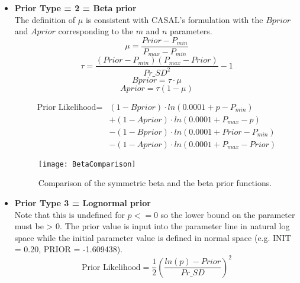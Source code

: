 \begin{itemize}
	
	\item \textbf{Prior Type = 2 = Beta prior}  \\ 
	The definition of $\mu$ is consistent with CASAL's formulation with the $Bprior$ and $Aprior$ corresponding to the $m$ and $n$ parameters.
	\begin{equation}
		\mu = \frac{Prior-P_{min}}{P_{max}-P_{min}} 
	\end{equation}
	\begin{equation}
		\tau  = \frac{(Prior-P_{min})(P_{max}-Prior)}{Pr\_SD^2}-1
	\end{equation}
	\begin{equation}
		Bprior  = \tau \cdot \mu
	\end{equation}
	\begin{equation}
		Aprior = \tau (1-\mu)
	\end{equation}
	
	\begin{equation}
		\begin{split}
			\text{Prior Likelihood} = & (1 - Bprior) \cdot ln(0.0001 + p - P_{min}) \\
			& + (1 - Aprior) \cdot ln(0.0001 + P_{max} - p) \\
			& - (1 - Bprior) \cdot ln(0.0001 + Prior - P_{min}) \\
			& - (1 - Aprior) \cdot ln(0.0001 + P_{max} - Prior)
		\end{split}
	\end{equation}

	\begin{figure}[h]
	\begin{center}
		\texttt{[image: BetaComparison]}\\
	\end{center}
	\caption{Comparison of the symmetric beta and the beta prior functions.}
	\end{figure}	

	
	\item \textbf{Prior Type 3 = Lognormal prior} \\ 
	Note that this is undefined for $p <= 0$ so the lower bound on the parameter must be > 0. The prior value is input into the parameter line in natural log space while the initial parameter value is defined in normal space (e.g. INIT = 0.20, PRIOR = -1.609438).
	\begin{equation}
		\text{Prior Likelihood} = \frac{1}{2} \left(\frac{ln(p)-Prior}{Pr\_SD}\right)^2
	\end{equation}
	

\end{itemize}
